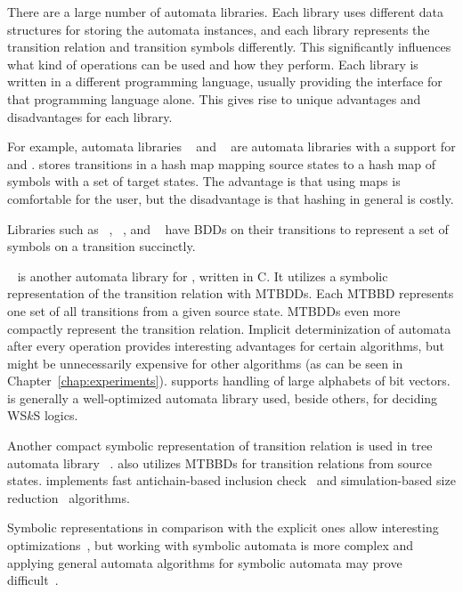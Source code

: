 There are a large number of automata libraries.
Each library uses different data structures for storing the automata instances,
and each library represents the transition relation and transition symbols differently.
This significantly influences what kind of operations can be used and how they perform.
Each library is written in a different programming language, usually providing the interface for that programming language alone.
This gives rise to unique advantages and disadvantages for each library.

For example, automata libraries \fado~\cite{fado} and \automatapy~\cite{automatapy} are automata libraries with a support for \nfas and \dfas.
\automatapy stores transitions in a hash map mapping source states to a hash map of symbols with a set of target states.
The advantage is that using maps is comfortable for the user, but the disadvantage is that hashing in general is costly.

Libraries such as \spot~\cite{spot}, \mosel~\cite{mosel}, and \owl~\cite{owl} have BDDs on their transitions to represent a set of symbols on a transition succinctly.

\mona~\cite{mona} is another automata library for \dfas, written in C.
It utilizes a symbolic representation of the transition relation with MTBDDs.
Each MTBBD represents one set of all transitions from a given source state.
MTBDDs even more compactly represent the transition relation.
Implicit determinization of automata after every operation provides interesting advantages for certain algorithms, but might be unnecessarily expensive for other algorithms (as can be seen in Chapter~\ref{chap:experiments}).
\mona supports handling of large alphabets of bit vectors.
\mona is generally a well-optimized automata library used, beside others, for deciding WS$k$S logics.

Another compact symbolic representation of transition relation is used in tree automata library \vata~\cite{vata}.
\vata also utilizes MTBBDs for transition relations from source states.
\vata implements fast antichain-based inclusion check~\cite{doyen-antichain-10} and simulation-based size reduction~\cite{ranzato_efficient_2010, treesimulation08} algorithms.

Symbolic representations in comparison with the explicit ones allow interesting optimizations~\cite{dantoni_taminimization_2016}, but working with symbolic automata is more complex and applying general automata algorithms for symbolic automata may prove difficult~\cite{dantoni_taminimization_2016, symbsim18}.


